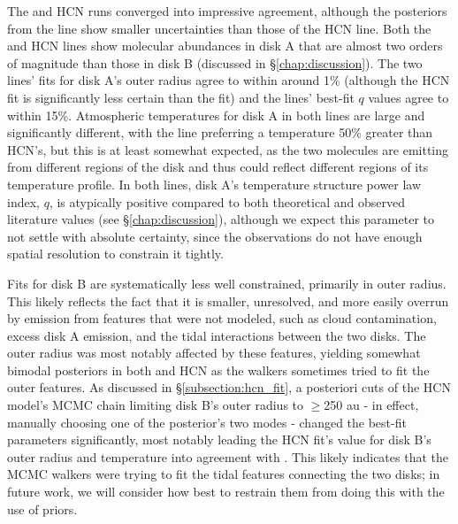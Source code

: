 The \hco{} and HCN runs converged into impressive agreement, although the posteriors from the \hco{} line show smaller uncertainties than those of the HCN line. Both the \hco{} and HCN lines show molecular abundances in disk A that are almost two orders of magnitude than those in disk B (discussed in \S\ref{chap:discussion}). The two lines' fits for disk A's outer radius agree to within around 1\% (although the HCN fit is significantly less certain than the \hco{} fit) and the lines' best-fit $q$ values agree to within 15\%. Atmospheric temperatures for disk A in both lines are large and significantly different, with the \hco{} line preferring a temperature 50\% greater than HCN's, but this is at least somewhat expected, as the two molecules are emitting from different regions of the disk and thus could reflect different regions of its temperature profile. In both lines, disk A's temperature structure power law index, $q$, is atypically positive compared to both theoretical and observed literature values (see \S\ref{chap:discussion}), although we expect this parameter to not settle with absolute certainty, since the observations do not have enough spatial resolution to constrain it tightly.


Fits for disk B are systematically less well constrained, primarily in outer radius. This likely reflects the fact that it is smaller, unresolved, and more easily overrun by emission from features that were not modeled, such as cloud contamination, excess disk A emission, and the tidal interactions between the two disks. The outer radius was most notably affected by these features, yielding somewhat bimodal posteriors in both \hco{} and HCN as the walkers sometimes tried to fit the outer features. As discussed in \S\ref{subsection:hcn_fit}, a posteriori cuts of the HCN model's MCMC chain limiting disk B's outer radius to $\geq$250 au - in effect, manually choosing one of the posterior's two modes -  changed the best-fit parameters significantly, most notably leading the HCN fit's value for disk B's outer radius and temperature into agreement with \hco. This likely indicates that the MCMC walkers were trying to fit the tidal features connecting the two disks; in future work, we will consider how best to restrain them from doing this with the use of priors.


